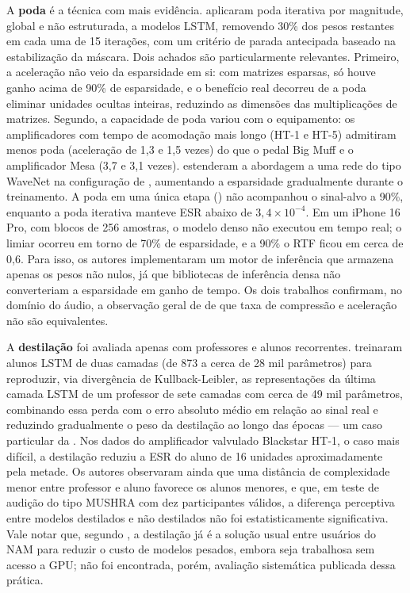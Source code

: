 \documentclass[%
  a4paper,%
  12pt,%
  fleqn,%
  english,%
  brazilian,%
]{article}
\begin{document}
A \textbf{poda} é a técnica com mais evidência.
\textcite{Sudholt2023} aplicaram poda iterativa por magnitude, global e não estruturada, a modelos LSTM, removendo 30\% dos pesos restantes em cada uma de 15 iterações, com um critério de parada antecipada baseado na estabilização da máscara.
Dois achados são particularmente relevantes.
Primeiro, a aceleração não veio da esparsidade em si: com matrizes esparsas, só houve ganho acima de 90\% de esparsidade, e o benefício real decorreu de a poda eliminar unidades ocultas inteiras, reduzindo as dimensões das multiplicações de matrizes.
Segundo, a capacidade de poda variou com o equipamento: os amplificadores com tempo de acomodação mais longo (HT-1 e HT-5) admitiram menos poda (aceleração de 1,3 e 1,5 vezes) do que o pedal Big Muff e o amplificador Mesa (3,7 e 3,1 vezes).
\textcite{Sato2026} estenderam a abordagem a uma rede do tipo WaveNet na configuração de \textcite{Wright2020}, aumentando a esparsidade gradualmente durante o treinamento.
A poda em uma única etapa () não acompanhou o sinal-alvo a 90\%, enquanto a poda iterativa manteve ESR abaixo de $3,4 \times 10^{-4}$.
Em um iPhone 16 Pro, com blocos de 256 amostras, o modelo denso não executou em tempo real; o limiar ocorreu em torno de 70\% de esparsidade, e a 90\% o RTF ficou em cerca de 0,6.
Para isso, os autores implementaram um motor de inferência que armazena apenas os pesos não nulos, já que bibliotecas de inferência densa não converteriam a esparsidade em ganho de tempo.
Os dois trabalhos confirmam, no domínio do áudio, a observação geral de \textcite{Blalock2020} de que taxa de compressão e aceleração não são equivalentes.

A \textbf{destilação} foi avaliada apenas com professores e alunos recorrentes.
\textcite{Simionato2025} treinaram alunos LSTM de duas camadas (de 873 a cerca de 28 mil parâmetros) para reproduzir, via divergência de Kullback-Leibler, as representações da última camada LSTM de um professor de sete camadas com cerca de 49 mil parâmetros, combinando essa perda com o erro absoluto médio em relação ao sinal real e reduzindo gradualmente o peso da destilação ao longo das épocas --- um caso particular da .
Nos dados do amplificador valvulado Blackstar HT-1, o caso mais difícil, a destilação reduziu a ESR do aluno de 16 unidades aproximadamente pela metade.
Os autores observaram ainda que uma distância de complexidade menor entre professor e aluno favorece os alunos menores, e que, em teste de audição do tipo MUSHRA com dez participantes válidos, a diferença perceptiva entre modelos destilados e não destilados não foi estatisticamente significativa.
Vale notar que, segundo \textcite{Atkinson2025}, a destilação já é a solução usual entre usuários do NAM para reduzir o custo de modelos pesados, embora seja trabalhosa sem acesso a GPU; não foi encontrada, porém, avaliação sistemática publicada dessa prática.
\end{document}
